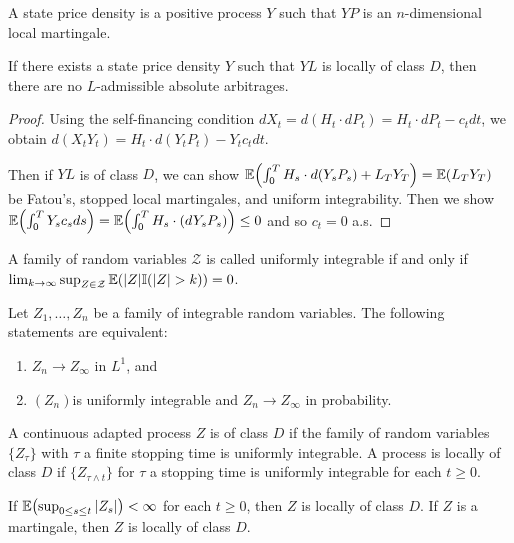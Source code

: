 \begin{defn}
  \label{sec:arbitr-theory-cont-5}
  A state price density is a positive \ito process $Y$ such that $YP$
  is an $n$-dimensional local martingale.
\end{defn}

\begin{thm}
  \label{sec:arbitr-theory-cont-6}
  If there exists a state price density $Y$ such that $YL$ is locally
  of class $D$, then there are no $L$-admissible absolute arbitrages.
\end{thm}

\begin{proof}
  Using the self-financing condition $d X_{t} = d (H_{t} \cdot dP_{t})
  = H_{t} \cdot dP_{t} - c_{t} dt$, we obtain $d(X_{t} Y_{t}) = H_{t}
  \cdot d(Y_{t} P_{t}) - Y_{t} c_{t} dt$.

  Then if $YL$ is of class $D$, we can show $\E{\int_{0}^{T} H_{s}
    \cdot d(Y_{s} P_{s}) + L_{T} Y_{T}} = \E{L_{T} Y_{T}}$ be Fatou's,
  stopped local martingales, and uniform integrability.  Then we show
  $\E{\int_{0}^{T} Y_{s} c_{s} ds} = \E{\int_{0}^{T} H_{s} \cdot
  (dY_{s} P_{s})} \leq 0$ and so $c_{t} = 0$ a.s.
\end{proof}

\begin{defn}
  \label{sec:arbitr-theory-cont-7}
  A family of random variables $\mathcal{Z}$ is called uniformly
  integrable if and only if $\lim_{k \rightarrow \infty} \sup_{Z \in
    \mathcal{Z}} \E{|Z| \I{|Z| > k}} = 0$.
\end{defn}

\begin{thm}
  \label{sec:arbitr-theory-cont-8}
  Let $Z_{1}, \dots, Z_{n}$ be a family of integrable random
  variables. The following statements are equivalent:
  \begin{enumerate}
  \item $Z_{n} \rightarrow Z_{\infty}$ in $L^{1}$, and
  \item $(Z_{n})$is uniformly integrable and $Z_{n} \rightarrow
    Z_{\infty}$ in probability.
  \end{enumerate}
\end{thm}

\begin{defn}
  \label{sec:arbitr-theory-cont-9}
  A continuous adapted process $Z$ is of class $D$ if the family of
  random variables $\{ Z_{\tau} \}$ with $\tau$ a finite stopping time
  is uniformly integrable.  A process is locally of class $D$ if $\{
  Z_{\tau \wedge t} \} $ for $\tau$ a stopping time is uniformly
  integrable for each $t \geq 0$.

  If $\E{\sup_{0 \leq s \leq t}|Z_{s}|} < \infty$ for each $t \geq 0$,
  then $Z$ is locally of class $D$.  If $Z$ is a martingale, then $Z$
  is locally of class $D$.
\end{defn}

